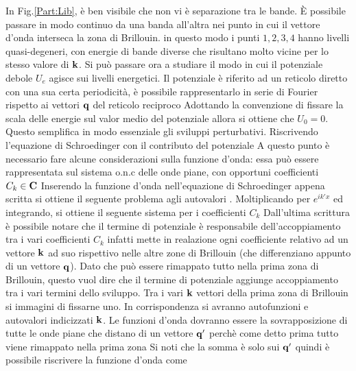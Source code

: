 In Fig.\ref{Part:Lib}, è ben visibile che non vi è separazione tra le bande. \`E possibile passare in modo continuo da una banda all'altra nei punto in cui il vettore d'onda interseca la zona di Brillouin. in questo modo i punti $1,2,3,4$ hanno livelli quasi-degeneri, con energie di bande diverse che risultano molto vicine per lo stesso valore di $\it\bf k$. Si può passare ora a studiare il modo in cui il potenziale debole $U_e$ agisce sui livelli energetici. Il potenziale è riferito ad un reticolo diretto con una sua certa periodicità, è possibile rappresentarlo in serie di Fourier rispetto ai vettori $\it\bf q$ del reticolo reciproco 
Adottando la convenzione di fissare la scala delle energie sul valor medio del potenziale allora si ottiene che $U_0=0$. Questo semplifica in modo essenziale gli sviluppi perturbativi. Riscrivendo l'equazione di Schroedinger con il contributo del potenziale
A questo punto è necessario fare alcune considerazioni sulla funzione d'onda: essa può essere rappresentata sul sistema o.n.c delle onde piane, con opportuni coefficienti $C_k\in\mathbf{C}$
Inserendo la funzione d'onda nell'equazione di Schroedinger appena scritta si ottiene il seguente problema agli autovalori
.
Moltiplicando per $e^{ik'x}$ ed integrando, si ottiene il seguente sistema per i coefficienti $C_k$
Dall'ultima scrittura è possibile notare che il termine di potenziale è responsabile dell'accoppiamento tra i vari coefficienti $C_k$ infatti mette in realazione ogni coefficiente relativo ad un vettore $\it\bf k$ ad suo rispettivo nelle altre zone di Brillouin (che differenziano appunto di un vettore $\it\bf q$). Dato che può essere rimappato tutto nella prima zona di Brillouin, questo vuol dire che il termine di potenziale aggiunge accoppiamento tra i vari termini dello sviluppo. Tra i vari $\it\bf k$ vettori della prima zona di Brillouin si immagini di fissarne uno. In corrispondenza si avranno autofunzioni e autovalori indicizzati $\it\bf k$. Le funzioni d'onda dovranno essere la sovrapposizione di tutte le onde piane che distano di un vettore $\it\bf q'$ perchè come detto prima tutto viene rimappato nella prima zona
Si noti che la somma è solo sui $\it\bf q'$ quindi è possibile riscrivere la funzione d'onda come

